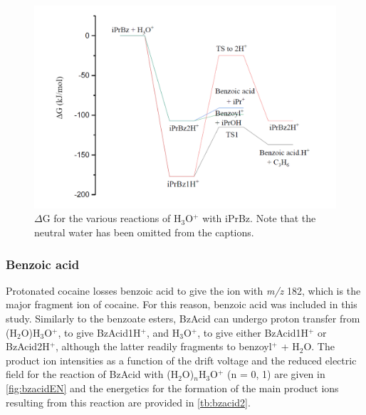 




\begin{figure}[htbp]
\centering
\includegraphics[width=0.7\linewidth]{pics/cocaine-chapter/iprbz_deltag.png}
\caption{$\Delta$G for the various reactions of H$_3$O$^+$ with iPrBz. Note that the neutral water has been omitted from the captions.}
\label{fig:iprbz_deltag}
\end{figure}










\subsubsection{Benzoic acid}
Protonated cocaine losses benzoic acid to give the ion with \textit{m/z} 182, which is the major fragment ion of cocaine.
%
For this reason, benzoic acid was included in this study.
%
%
%
%
Similarly to the benzoate esters, BzAcid can undergo proton transfer from (H$_2$O)H$_3$O$^+$, to give BzAcid1H$^+$, and H$_3$O$^+$, to give either BzAcid1H$^+$ or BzAcid2H$^+$, although the latter readily fragments to benzoyl$^+$ + H$_2$O. 
%
The product ion intensities as a function of the drift voltage and the reduced electric field for the reaction of BzAcid with (H$_2$O)$_n$H$_3$O$^+$ (n = 0, 1) are given in \autoref{fig:bzacidEN} and the energetics for the formation of the main product ions resulting from this reaction are provided in \autoref{tb:bzacid2}.

